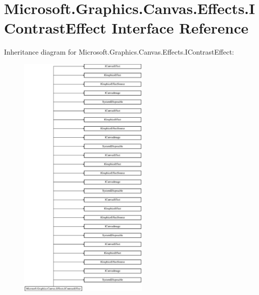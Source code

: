 \hypertarget{interface_microsoft_1_1_graphics_1_1_canvas_1_1_effects_1_1_i_contrast_effect}{}\section{Microsoft.\+Graphics.\+Canvas.\+Effects.\+I\+Contrast\+Effect Interface Reference}
\label{interface_microsoft_1_1_graphics_1_1_canvas_1_1_effects_1_1_i_contrast_effect}
Inheritance diagram for Microsoft.\+Graphics.\+Canvas.\+Effects.\+I\+Contrast\+Effect\+:\begin{figure}[H]
\begin{center}
\leavevmode
\includegraphics[height=12.000000cm]{interface_microsoft_1_1_graphics_1_1_canvas_1_1_effects_1_1_i_contrast_effect}
\end{center}
\end{figure}
